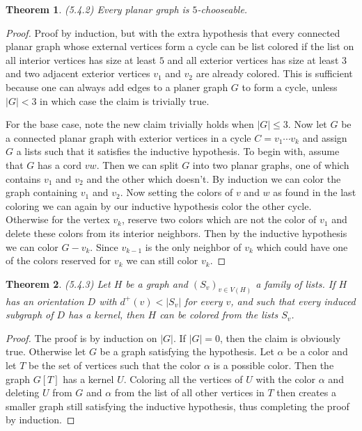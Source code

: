 \documentclass[12pt]{article}
\newtheorem{theorem}{Theorem}
\begin{document}
\begin{theorem} (5.4.2) Every planar graph is $5$-chooseable.
\end{theorem}
\begin{proof} Proof by induction, but with the extra hypothesis that
  every connected planar graph whose external vertices form a cycle
  can be list colored if the list on all interior vertices has size at
  least $5$ and all exterior vertices has size at least $3$ and two
  adjacent exterior vertices $v_1$ and $v_2$ are already colored. This
  is sufficient because one can always add edges to a planer graph $G$
  to form a cycle, unless $|G| < 3$ in which case the claim is
  trivially true.

  For the base case, note the new claim trivially holds when
  $|G| \leq 3$. Now let $G$ be a connected planar graph with exterior
  vertices in a cycle $C = v_1 \cdots v_k$ and assign $G$ a lists such
  that it satisfies the inductive hypothesis. To begin with, assume
  that $G$ has a cord $vw$. Then we can split $G$ into two planar
  graphs, one of which contains $v_1$ and $v_2$ and the other which
  doesn't. By induction we can color the graph containing $v_1$ and
  $v_2$. Now setting the colors of $v$ and $w$ as found in the last
  coloring we can again by our inductive hypothesis color the other
  cycle. Otherwise for the vertex $v_k$, reserve two colors which are
  not the color of $v_1$ and delete these colors from its interior
  neighbors. Then by the inductive hypothesis we can color
  $G-v_k$. Since $v_{k-1}$ is the only neighbor of $v_k$ which could
  have one of the colors reserved for $v_k$ we can still color $v_k$.
\end{proof}

\begin{theorem} (5.4.3) Let $H$ be a graph and ${(S_v)}_{v \in V(H)}$
  a family of lists. If $H$ has an orientation $D$ with
  $d^+(v) < |S_v|$ for every $v$, and such that every induced subgraph
  of $D$ has a kernel, then $H$ can be colored from the lists $S_v$.
\end{theorem}
\begin{proof} The proof is by induction on $|G|$. If $|G| = 0$, then
  the claim is obviously true. Otherwise let $G$ be a graph satisfying
  the hypothesis. Let $\alpha$ be a color and let $T$ be the set of
  vertices such that the color $\alpha$ is a possible color. Then the
  graph $G[T]$ has a kernel $U$. Coloring all the vertices of $U$ with
  the color $\alpha$ and deleting $U$ from $G$ and $\alpha$ from the
  list of all other vertices in $T$ then creates a smaller graph still
  satisfying the inductive hypothesis, thus completing the proof by
  induction.
\end{proof}
\end{document}

